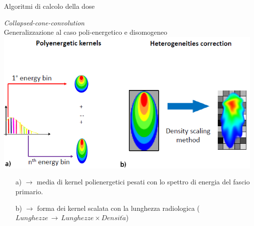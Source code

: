 \documentclass{beamer}
\begin{document}
\begin{frame}[t]{Algoritmi di calcolo della dose}
\small
{\centering
\alert{\textit{Collapsed-cone-convolution}\\
\footnotesize Generalizzazione al caso poli-energetico e disomogeneo} \\ \vspace{.5cm}
\includegraphics[width=.7\textwidth]{../cap1/kern_trans.png}\\
\scriptsize
\begin{itemize}
\item[a)]  $\rightarrow$ media di kernel polienergetici pesati con lo spettro di energia del fascio primario.
\item[b)]  $\rightarrow$ forma dei kernel scalata con la lunghezza radiologica ($Lunghezze\,\rightarrow\,Lunghezze \times Densit\grave{a}$)
\end{itemize}
}
\end{frame}
\end{document}
